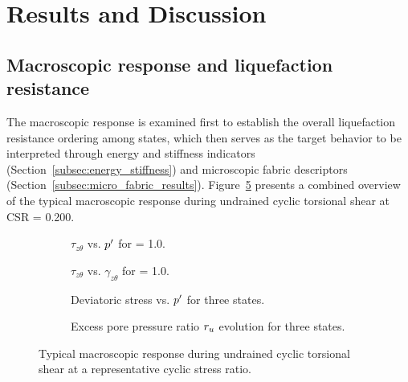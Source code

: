 \section{Results and Discussion}
\label{sec:results}

\subsection{Macroscopic response and liquefaction resistance}
\label{subsec:macro_response}

The macroscopic response is examined first to establish the overall liquefaction resistance ordering among \Kzero{} states, which then serves as the target behavior to be interpreted through energy and stiffness indicators (Section~\ref{subsec:energy_stiffness}) and microscopic fabric descriptors (Section~\ref{subsec:micro_fabric_results}). Figure~\ref{fig:macro_response} presents a combined overview of the typical macroscopic response during undrained cyclic torsional shear at CSR = 0.200.

\begin{figure}[t]
  \centering
  \begin{subfigure}[t]{0.48\textwidth}
    \centering
    \caption{$\tau_{z\theta}$ vs. $p^\prime$ for \Kzero{} = 1.0.}
    \label{fig:macro_response_a}
  \end{subfigure}
  \hfill
  \begin{subfigure}[t]{0.48\textwidth}
    \centering
    \caption{$\tau_{z\theta}$ vs. $\gamma_{z\theta}$ for \Kzero{} = 1.0.}
    \label{fig:macro_response_b}
  \end{subfigure}

  \vspace{0.5em}

  \begin{subfigure}[t]{0.48\textwidth}
    \centering
    \caption{Deviatoric stress vs. $p^\prime$ for three \Kzero{} states.}
    \label{fig:macro_response_c}
  \end{subfigure}
  \hfill
  \begin{subfigure}[t]{0.48\textwidth}
    \centering
    \caption{Excess pore pressure ratio $r_u$ evolution for three \Kzero{} states.}
    \label{fig:macro_response_d}
  \end{subfigure}
  \caption{Typical macroscopic response during undrained cyclic torsional shear at a representative cyclic stress ratio.}
  \label{fig:macro_response}
\end{figure}

